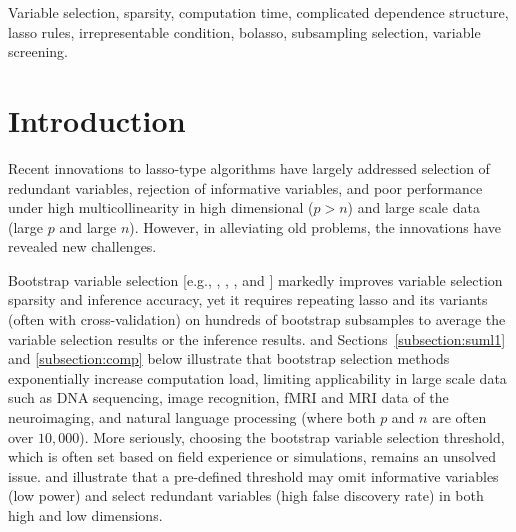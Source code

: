 \documentclass[11pt,review,authoryear]{elsarticle}
\begin{document}
\begin{keyword}
Variable selection, sparsity, computation time, complicated dependence structure, lasso rules, irrepresentable condition, bolasso, subsampling selection, variable screening.
\end{keyword}

\maketitle




\section{Introduction}

Recent innovations to lasso-type algorithms \citep{efronall04, friedman2007pathwise, friedman2010regularization} have largely addressed selection of redundant variables, rejection of informative variables, and poor performance under high multicollinearity in high dimensional ($p>n$) and large scale data (large $p$ and large $n$). However, in alleviating old problems, the innovations have revealed new challenges.

Bootstrap variable selection [e.g., \citet{bach2008bolasso}, \citet{meinshausen2010stability}, \citet{wang2011random}, and \citet{mameli2017estimating}] markedly improves variable selection sparsity and inference accuracy, yet it requires repeating lasso and its variants (often with cross-validation) on hundreds of bootstrap subsamples to average the variable selection results or the inference results. \citet{xu2012asymptotic} and Sections~\ref{subsection:suml1} and \ref{subsection:comp} below illustrate that bootstrap selection methods exponentially increase computation load, limiting applicability in large scale data such as DNA sequencing, image recognition, fMRI and MRI data of the neuroimaging, and natural language processing (where both $p$ and $n$ are often over $10,000$). More seriously, choosing the bootstrap variable selection threshold, which is often set based on field experience or simulations, remains an unsolved issue. \citet{bach2008bolasso} and \citet[Figure~2]{huang2014stat} illustrate that a pre-defined threshold may omit informative variables (low power) and select redundant variables (high false discovery rate) in both high and low dimensions.
\end{document}
